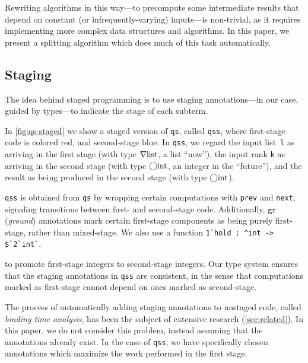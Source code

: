 \begin{abstrsyn}
Rewriting algorithms in this way---to 
precompute some intermediate results that depend on constant (or infrequently-varying) inputs---is non-trivial,
as it requires implementing more complex data structures and algorithms.  
In this paper, we present a splitting algorithm which does much of this task automatically.

\subsection{Staging}


The idea behind staged programming is to use staging annotations---in our case,
guided by types---to indicate the stage of each subterm. 

In \ref{fig:qs-staged} we show a staged version of \texttt{qs}, called
\texttt{qss}, where first-stage code is colored red, and second-stage blue. In
\texttt{qss}, we regard the input list~\texttt{l} as arriving in the first stage
(with type $\nabla\mathrm{list}$, a list ``now''), the input rank \texttt{k} as
arriving in the second stage (with type $\bigcirc{\rm int}$, an integer in the
``future''), and the result as being produced in the second stage (with type
$\bigcirc{\rm int}$).

\texttt{qss} is obtained from \texttt{qs} by wrapping certain computations with
\texttt{prev} and \texttt{next}, signaling transitions between first- and
second-stage code. Additionally, $\texttt{gr}$ (\emph{ground}) annotations 
mark certain first-stage components as being purely first-stage, rather than mixed-stage.
%
We also use a function 
\lstinline{1`hold : ^int -> $`2`int`}, 
\begin{comment}$ this comment block is here for syntax highlighting reasons\end{comment}
to promote first-stage integers to second-stage integers.
%
Our type system ensures that the staging annotations in \texttt{qss} are
consistent, in the sense that computations marked as first-stage cannot depend
on ones marked as second-stage.

The process of automatically adding staging annotations to unstaged code,
called \emph{binding time analysis}, has been
the subject of extensive research (\ref{sec:related}). In this paper, we do not
consider this problem, instead assuming that the annotations already exist.
In the case of \texttt{qss}, we have specifically chosen annotations which
maximize the work performed in the first stage.


\end{abstrsyn}
